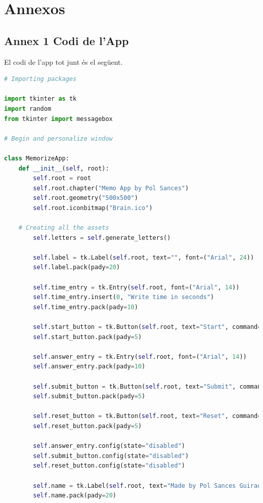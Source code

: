 \part{Annexos}

\chapter*{Annex 1 Codi de l'App}

El codi de l'app tot junt és el següent.

\begin{lstlisting}[language=Python, style=colorEX, caption=Codi sencer de l'App]
    # Importing packages

import tkinter as tk
import random
from tkinter import messagebox

# Begin and personalize window

class MemorizeApp:
    def __init__(self, root):
        self.root = root
        self.root.chapter("Memo App by Pol Sances")
        self.root.geometry("500x500")
        self.root.iconbitmap("Brain.ico")

    # Creating all the assets
        self.letters = self.generate_letters()

        self.label = tk.Label(self.root, text="", font=("Arial", 24))
        self.label.pack(pady=20)

        self.time_entry = tk.Entry(self.root, font=("Arial", 14))
        self.time_entry.insert(0, "Write time in seconds")
        self.time_entry.pack(pady=10)

        self.start_button = tk.Button(self.root, text="Start", command=self.start_memorize)
        self.start_button.pack(pady=5)

        self.answer_entry = tk.Entry(self.root, font=("Arial", 14))
        self.answer_entry.pack(pady=10)

        self.submit_button = tk.Button(self.root, text="Submit", command=self.check_answers)
        self.submit_button.pack(pady=5)

        self.reset_button = tk.Button(self.root, text="Reset", command=self.reset)
        self.reset_button.pack(pady=5)

        self.answer_entry.config(state="disabled")
        self.submit_button.config(state="disabled")
        self.reset_button.config(state="disabled")

        self.name = tk.Label(self.root, text="Made by Pol Sances Guirao", font=("Arial", 8))
        self.name.pack(pady=20)


\end{lstlisting}
